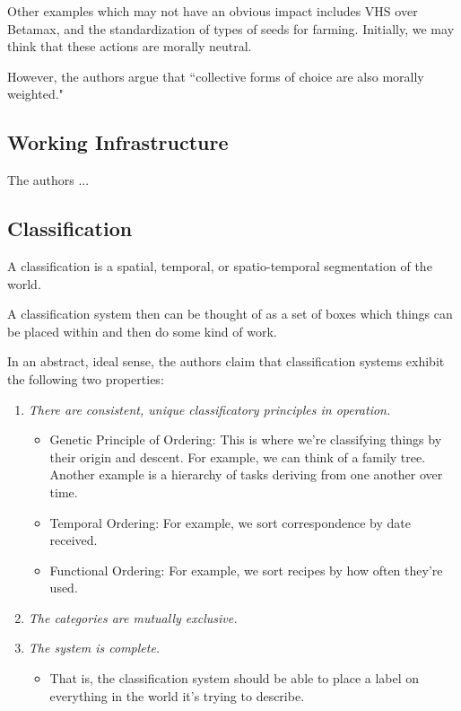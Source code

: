 \documentclass[openany]{book}
\begin{document}
Other examples which may not have an obvious impact includes VHS over Betamax, and the standardization of types of seeds for farming. Initially, we may think that these actions are morally neutral.

However, the authors argue that ``collective forms of choice are also morally weighted."

\subsection{Working Infrastructure}
The authors ...

\subsection{Classification}
\begin{defn}[Classification]
	A classification is a spatial, temporal, or spatio-temporal segmentation of the world.
\end{defn}

A classification system then can be thought of as a set of boxes which things can be placed within and then do some kind of work.

In an abstract, ideal sense, the authors claim that classification systems exhibit the following two properties:
\begin{enumerate}
	\item \textit{There are consistent, unique classificatory principles in operation.}
	\begin{itemize}
		\item Genetic Principle of Ordering: This is where we're classifying things by their origin and descent. For example, we can think of a family tree. Another example is a hierarchy of tasks deriving from one another over time.
		\item Temporal Ordering: For example, we sort correspondence by date received.
		\item Functional Ordering: For example, we sort recipes by how often they're used.
	\end{itemize}

	\item \textit{The categories are mutually exclusive.}
	
	\item \textit{The system is complete.}
	\begin{itemize}
		\item That is, the classification system should be able to place a label on everything in the world it's trying to describe.
	\end{itemize}
\end{enumerate}
\end{document}

